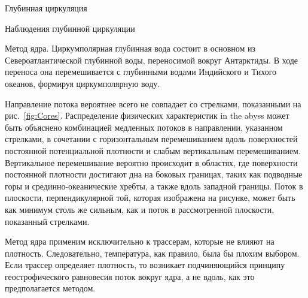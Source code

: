 \begin{chapter}{Глубинная циркуляция}
\begin{section}{Наблюдения глубинной циркуляции}
\begin{paragraph}{Метод ядра.}
Циркумполярная глубинная вода 
состоит в основном из Североатлантической глубинной воды, переносимой вокруг 
Антарктиды. В ходе переноса она перемешивается с глубинными водами Индийского
и Тихого океанов, формируя циркумполярную воду.
%

Направление потока вероятнее всего не совпадает со стрелками, показанными
на рис.~\ref{fig:Cores}. Распределение физических характеристик 
in the abyss может быть объяснено комбинацией медленных потоков
в направлении, указанном стрелками, в сочетании с горизонтальным 
перемешиванием вдоль 
поверхностей постоянной потенциальной плотности и слабым вертикальным 
перемешиванием. Вертикальное 
перемешивание вероятно происходит
в областях, где поверхности постоянной плотности достигают дна
на боковых границах, таких как подводные горы и срединно-океанические хребты,
а также вдоль западной границы. Поток в плоскости, перпендикулярной той, 
которая изображена на рисунке, может быть как минимум столь же сильным, как
и поток в рассмотренной плоскости, показанный стрелками.
%

Метод ядра применим исключительно к трассерам, которые не
влияют на плотность. Следовательно, температура, как правило, была бы плохим
выбором. Если трассер определяет плотность, то возникает подчиняющийся 
принципу геострофического равновесия поток вокруг ядра, а не вдоль, как это 
предполагается методом.
%


\end{paragraph}
\end{section}
\end{chapter}
